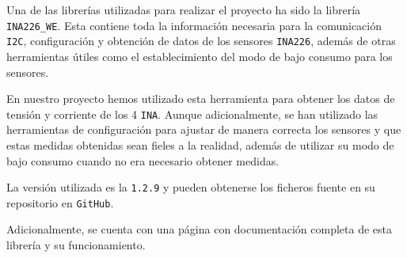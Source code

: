Una de las librerías utilizadas para realizar el proyecto ha sido la librería \texttt{INA226\_WE}.  Esta contiene toda la información necesaria para la comunicación \texttt{I2C}, configuración y obtención de datos de los sensores \texttt{INA226}, además de otras herramientas útiles como el establecimiento del modo de bajo consumo para los sensores.

En nuestro proyecto hemos utilizado esta herramienta para obtener los datos de tensión y corriente de los 4 \texttt{INA}.  Aunque adicionalmente, se han utilizado las herramientas de configuración para ajustar de manera correcta los sensores y que estas medidas obtenidas sean fieles a la realidad, además de utilizar su modo de bajo consumo cuando no era necesario obtener medidas.

La versión utilizada es la \texttt{1.2.9} y pueden obtenerse los ficheros fuente en su repositorio en \texttt{GitHub}. \cite{ewaldWollewaldINA226_WE2024}

Adicionalmente, se cuenta con una página con documentación completa de esta librería y su funcionamiento. \cite{ewaldINA226CurrentPower2021}